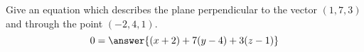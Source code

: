 \begin{problem}
Give an equation which describes the plane perpendicular to the vector $(1,7,3)$ and through the point $(-2,4,1)$.
\[
0=\answer{(x+2)+7(y-4)+3(z-1)}
\]
\end{problem}